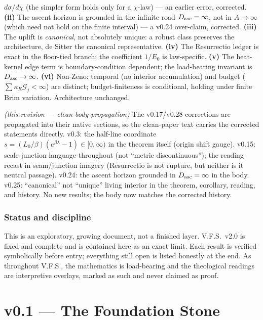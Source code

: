 \documentclass[11pt,a4paper]{article}
\theoremstyle{plain}
\theoremstyle{definition}
\theoremstyle{remark}
\begin{document}
\begin{description}[leftmargin=4.2em,style=nextline,itemsep=2pt]
$d\sigma/d\chi$ (the simpler form holds only for a $\chi$-law) --- an earlier error, corrected.
\textbf{(ii)} The ascent horizon is grounded in the infinite road $D_{\rm asc}=\infty$, not in
$A\to\infty$ (which need not hold on the finite interval) --- a v0.24 over-claim, corrected.
\textbf{(iii)} The uplift is \emph{canonical}, not absolutely unique: a robust class preserves the
architecture, de Sitter the canonical representative. \textbf{(iv)} The Resurrectio ledger is exact in
the floor-tied branch; the coefficient $1/E_0$ is law-specific. \textbf{(v)} The heat-kernel edge term
is boundary-condition dependent; the load-bearing invariant is $D_{\rm asc}\to\infty$. \textbf{(vi)}
Non-Zeno: temporal (no interior accumulation) and budget ($\sum\kappa_R\mathcal G_j<\infty$) are
distinct; budget-finiteness is conditional, holding under finite Brim variation. Architecture unchanged.
\item[\textbf{v0.29}] \emph{(this revision --- clean-body propagation)} The v0.17/v0.28 corrections are
propagated into their native sections, so the clean-paper text carries the corrected statements
directly. v0.3: the half-line coordinate $s=(L_0/\beta)(e^{\beta\lambda}-1)\in[0,\infty)$ in the
theorem itself (origin shift gauge). v0.15: scale-junction language throughout (not ``metric
discontinuous''); the reading recast in seam/junction imagery (Resurrectio is not rupture, but neither
is it neutral passage). v0.24: the ascent horizon grounded in $D_{\rm asc}=\infty$ in the body. v0.25:
``canonical'' not ``unique'' living interior in the theorem, corollary, reading, and history. No new
results; the body now matches the corrected history.
\end{description}

\section*{Status and discipline}
This is an exploratory, growing document, not a finished layer. V.F.S.~v2.0 is fixed and complete and
is contained here as an exact limit. Each result is verified symbolically before entry; everything
still open is listed honestly at the end. As throughout V.F.S., the mathematics is load-bearing and
the theological readings are interpretive overlays, marked as such and never claimed as proof.

\part*{v0.1 --- The Foundation Stone}
\end{document}
